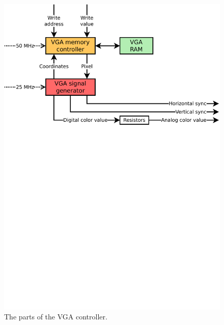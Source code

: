 \begin{figure}[h!]
\centering
\includegraphics[width=\linewidth,clip,trim=0 18cm 0 0]
                {fig/fpga/vga.pdf}
\caption[VGA controller]
        {The parts of the VGA controller.}
\label{fig:vga}
\end{figure}
